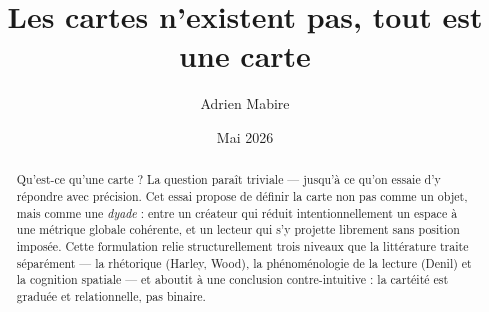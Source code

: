 \documentclass[12pt,a4paper]{article}
\title{Les cartes n'existent pas, tout est une carte}
\author{Adrien Mabire}
\date{Mai 2026}
\begin{document}
\maketitle
\thispagestyle{empty}

\vspace{2em}
\begin{abstract}
\noindent
Qu'est-ce qu'une carte ? La question paraît triviale — jusqu'à ce qu'on essaie d'y répondre avec précision. Cet essai propose de définir la carte non pas comme un objet, mais comme une \textit{dyade} : entre un créateur qui réduit intentionnellement un espace à une métrique globale cohérente, et un lecteur qui s'y projette librement sans position imposée. Cette formulation relie structurellement trois niveaux que la littérature traite séparément — la rhétorique (Harley, Wood), la phénoménologie de la lecture (Denil) et la cognition spatiale — et aboutit à une conclusion contre-intuitive : la cartéité est graduée et relationnelle, pas binaire.
\end{abstract}

\vspace{2em}
\tableofcontents
\newpage











\newpage
\printbibliography[title={Références}]
\end{document}
